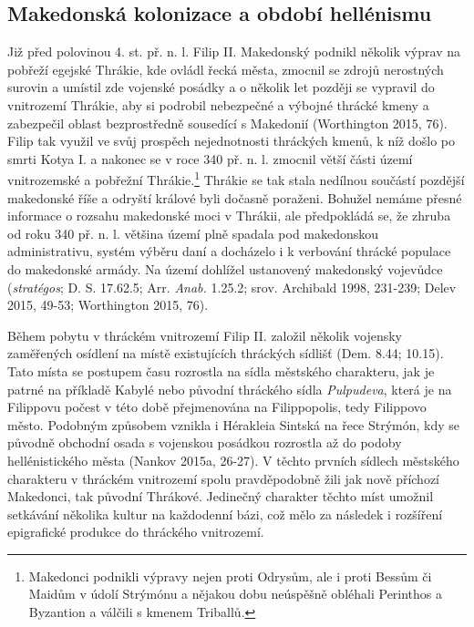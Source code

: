 \subsection[makedonská-kolonizace-a-období-hellénismu]{Makedonská kolonizace a období hellénismu}

Již před polovinou 4. st. př. n. l. Filip II. Makedonský podnikl několik výprav na pobřeží egejské Thrákie, kde ovládl řecká města, zmocnil se zdrojů nerostných surovin a umístil zde vojenské posádky a o několik let později se vypravil do vnitrozemí Thrákie, aby si podrobil nebezpečné a výbojné thrácké kmeny a zabezpečil oblast bezprostředně sousedící s Makedonií (Worthington 2015, 76). Filip tak využil ve svůj prospěch nejednotnosti thráckých kmenů, k níž došlo po smrti Kotya I. a nakonec se v roce 340 př. n. l. zmocnil větší části území vnitrozemské a pobřežní Thrákie.\footnote{Makedonci podnikli výpravy nejen proti Odrysům, ale i proti Bessům či Maidům v údolí Strýmónu a nějakou dobu neúspěšně obléhali Perinthos a Byzantion a válčili s kmenem Triballů.} Thrákie se tak stala nedílnou součástí pozdější makedonské říše a odryští králové byli dočasně poraženi. Bohužel nemáme přesné informace o rozsahu makedonské moci v Thrákii, ale předpokládá se, že zhruba od roku 340 př. n. l. většina území plně spadala pod makedonskou administrativu, systém výběru daní a docházelo i k verbování thrácké populace do makedonské armády. Na území dohlížel ustanovený makedonský vojevůdce ({\em stratégos}; D. S. 17.62.5; Arr. {\em Anab.} 1.25.2; srov. Archibald 1998, 231-239; Delev 2015, 49-53; Worthington 2015, 76).

Během pobytu v thráckém vnitrozemí Filip II. založil několik vojensky zaměřených osídlení na místě existujících thráckých sídlišť (Dem. 8.44; 10.15). Tato místa se postupem času rozrostla na sídla městského charakteru, jak je patrné na příkladě Kabylé nebo původní thráckého sídla {\em Pulpudeva}, která je na Filippovu počest v této době přejmenována na Filippopolis, tedy Filippovo město. Podobným způsobem vznikla i Hérakleia Sintská na řece Strýmón, kdy se původně obchodní osada s vojenskou posádkou rozrostla až do podoby hellénistického města (Nankov 2015a, 26-27). V těchto prvních sídlech městského charakteru v thráckém vnitrozemí spolu pravděpodobně žili jak nově příchozí Makedonci, tak původní Thrákové. Jedinečný charakter těchto míst umožnil setkávání několika kultur na každodenní bázi, což mělo za následek i rozšíření epigrafické produkce do thráckého vnitrozemí.

